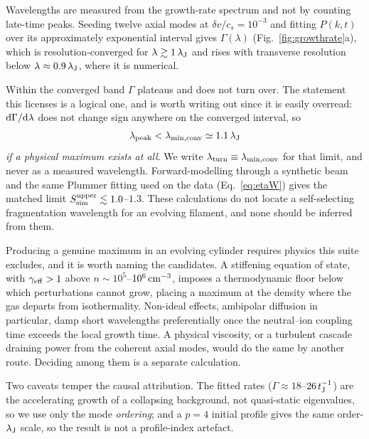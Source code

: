 \documentclass[usenatbib,twoside,twocolumn]{mnras}
\begin{document}
Wavelengths are measured from the growth-rate spectrum and not by counting late-time peaks. Seeding twelve axial modes at $\delta v/c_s=10^{-3}$ and fitting $P(k,t)$ over its approximately exponential interval gives $\Gamma(\lambda)$ (Fig.~\ref{fig:growthrate}a), which is resolution-converged for $\lambda\gtrsim1\,\lambda_{\rm J}$ and rises with transverse resolution below $\lambda\approx0.9\,\lambda_{\rm J}$, where it is numerical.

Within the converged band $\Gamma$ plateaus and does not turn over. The statement this licenses is a logical one, and is worth writing out since it is easily overread: ${\rm d}\Gamma/{\rm d}\lambda$ does not change sign anywhere on the converged interval, so
\begin{equation}
\lambda_{\rm peak}<\lambda_{\rm min,conv}\simeq1.1\,\lambda_{\rm J}
\label{eq:bound}
\end{equation}
\emph{if a physical maximum exists at all}. We write $\lambda_{\rm turn}\equiv\lambda_{\rm min,conv}$ for that limit, and never as a measured wavelength. Forward-modelling through a synthetic beam and the same Plummer fitting used on the data (Eq.~\ref{eq:etaW}) gives the matched limit $S_{\rm sim}^{\rm upper}\lesssim1.0$--$1.3$. These calculations do not locate a self-selecting fragmentation wavelength for an evolving filament, and none should be inferred from them.

Producing a genuine maximum in an evolving cylinder requires physics this suite excludes, and it is worth naming the candidates. A stiffening equation of state, with $\gamma_{\rm eff}>1$ above $n\sim10^{5}$--$10^{6}\,{\rm cm^{-3}}$, imposes a thermodynamic floor below which perturbations cannot grow, placing a maximum at the density where the gas departs from isothermality. Non-ideal effects, ambipolar diffusion in particular, damp short wavelengths preferentially once the neutral--ion coupling time exceeds the local growth time. A physical viscosity, or a turbulent cascade draining power from the coherent axial modes, would do the same by another route. Deciding among them is a separate calculation.

Two caveats temper the causal attribution. The fitted rates ($\Gamma\approx18$--$26\,t_{\rm J}^{-1}$) are the accelerating growth of a collapsing background, not quasi-static eigenvalues, so we use only the mode \emph{ordering}; and a $p=4$ initial profile gives the same order-$\lambda_{\rm J}$ scale, so the result is not a profile-index artefact.
\end{document}
